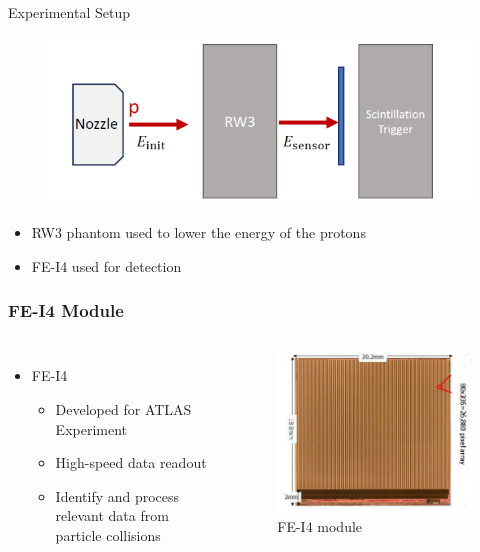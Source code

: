 \begin{frame}{\huge{Experimental Setup}}
  \begin{figure}
    \centering
    \label{fig:exset}
    \includegraphics[scale=.4]{figures/exset.png}
  \end{figure}
  \begin{itemize}
    \item RW3 phantom used to lower the energy of the protons
    \item FE-I4 used for detection
  \end{itemize}
\end{frame}
\begin{frame}
\frametitle{\huge{FE-I4 Module}}
  \begin{columns}
    \begin{itemize}
      \item FE-I4
      \begin{itemize}
        \item[\rightarrow] Developed for ATLAS Experiment
        \item[\rightarrow] High-speed data readout
        \item[\rightarrow] Identify and process relevant data from particle collisions
      \end{itemize}
    \end{itemize}
    \begin{figure}
      \centering
      \label{fig:exset2}
      \includegraphics[scale=.6]{figures/exset2.png}
      \caption*{FE-I4 module \cite[p.~3]{exset2}}
    \end{figure}
  \end{columns}
\end{frame}
